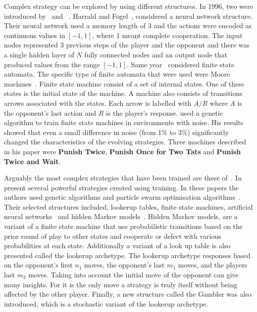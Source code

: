 \documentclass{article}
\theoremstyle{definition}
\begin{document}
Complex strategy can be explored by using different structures. In 1996,
two were introduced by~\cite{Harrald1996} and ~\cite{Miller1996}.
Harrald and Fogel~\cite{Harrald1996}, considered a neural network structure.
Their neural network used a memory length of 3 and the actions were encoded as
continuous values in \([-1, 1]\),
where 1 meant complete cooperation. The input nodes represented 3 previous steps
of the player and the opponent and there was a single hidden layer of \(N\) fully
connected nodes and an output node that produced values from the range \([-1, 1]\).
Same year~\cite{Miller1996} considered finite state automata.
The specific type of finite automata that were used were Moore machines~\cite{moore1956}.
Finite state machine consist of a set of internal states. One of these states
is the initial state of the machine. A machine also consists of transitions
arrows associated with the states. Each arrow is labelled with \(A/R\) where
\(A\) is the opponent's last action and \(R\) is the player's response.
\cite{Miller1996} used a genetic algorithm to train finite state machines in
environments with noise. His results showed that even a small difference in noise
(from 1\% to 3\%) significantly changed the characteristics of the
evolving strategies. Three machines described in his paper were \textbf{Punish Twice},
\textbf{Punish Once for Two Tats} and \textbf{Punish Twice and Wait}.


Arguably the most complex strategies that have been trained are these of~\cite{Knight2017, KnightHGC17}.
In~\cite{Knight2017, KnightHGC17} present several powerful strategies
created using training. In these
papers the authors used genetic algorithms and particle swarm optimisation
algorithms~\cite{suganthan1999}. Their selected structures included, lookerup tables,
finite state machines, artificial neural networks~\cite{yegnanarayana2009} and
hidden Markov models~\cite{eddy1996}.
Hidden Markov models, are a variant of a finite state machine that use probabilistic
transitions based on the prior round of play to other states and cooperate or
defect with various probabilities at each state.
Additionally a variant of a look up table is also presented called the lookerup
archetype. The lookerup archetype responses based on the opponent's first \(n_1\)
moves, the opponent's last \(m_1\) moves, and the players last \(m_2\) moves.
Taking into account the initial move of the opponent can give many insights.
For it is the only move a strategy is truly itself without being affected by
the other player. Finally, a new structure called the Gambler was also introduced,
which is a stochastic variant of the lookerup archetype.
\end{document}
